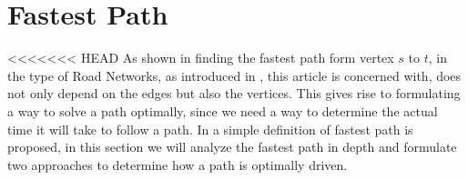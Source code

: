 \section{Fastest Path}
<<<<<<< HEAD
As shown in  finding the fastest path form vertex $s$ to $t$, in the type of Road Networks, as introduced in , this article is concerned with, does not only depend on the edges but also the vertices. This gives rise to formulating a way to solve a path optimally, since we need a way to determine the actual time it will take to follow a path. In  a simple definition of fastest path is proposed, in this section we will analyze the fastest path in depth and formulate two approaches to determine how a path is optimally driven.  
    

